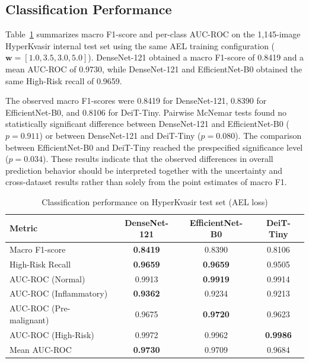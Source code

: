 \documentclass[11pt,a4paper]{article}
\begin{document}
\subsection{Classification Performance}

Table~\ref{tab:main_perf} summarizes macro F1-score and per-class AUC-ROC
on the 1,145-image HyperKvasir internal test set using the same AEL
training configuration ($\mathbf{w}=[1.0,3.5,3.0,5.0]$). DenseNet-121
obtained a macro F1-score of 0.8419 and a mean AUC-ROC of 0.9730, while
DenseNet-121 and EfficientNet-B0 obtained the same High-Risk recall of 0.9659.

The observed macro F1-scores were 0.8419 for DenseNet-121, 0.8390 for
EfficientNet-B0, and 0.8106 for DeiT-Tiny. Pairwise McNemar tests found no
statistically significant difference between DenseNet-121 and EfficientNet-B0
($p=0.911$) or between DenseNet-121 and DeiT-Tiny ($p=0.080$). The comparison
between EfficientNet-B0 and DeiT-Tiny reached the prespecified significance
level ($p=0.034$). These results indicate that the observed differences in
overall prediction behavior should be interpreted together with the uncertainty
and cross-dataset results rather than solely from the point estimates of
macro F1.

\begin{table}[H]
\centering
\caption{Classification performance on HyperKvasir test set (AEL loss)}
\label{tab:main_perf}
\begin{tabular}{lccc}
\toprule
\textbf{Metric} & \textbf{DenseNet-121} & \textbf{EfficientNet-B0} &
\textbf{DeiT-Tiny}\\
\midrule
Macro F1-score          & \textbf{0.8419} & 0.8390        & 0.8106\\
High-Risk Recall        & \textbf{0.9659} & \textbf{0.9659} & 0.9505\\
AUC-ROC (Normal)        & 0.9913        & \textbf{0.9919} & 0.9914\\
AUC-ROC (Inflammatory)  & \textbf{0.9362} & 0.9234        & 0.9213\\
AUC-ROC (Pre-malignant) & 0.9675        & \textbf{0.9720} & 0.9623\\
AUC-ROC (High-Risk)     & 0.9972        & 0.9962        & \textbf{0.9986}\\
Mean AUC-ROC            & \textbf{0.9730} & 0.9709        & 0.9684\\
\bottomrule
\end{tabular}
\end{table}
\end{document}
